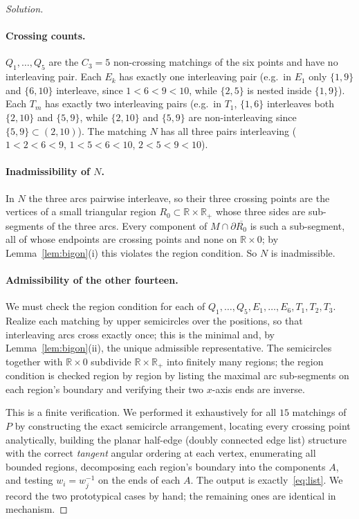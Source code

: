 \documentclass{amsart}
\theoremstyle{definition}
\newcommand{\RR}{\mathbb{R}}
\newcommand{\bdy}{\partial}
\begin{document}
\begin{proof}[Solution]
\paragraph{Crossing counts.}
$Q_1,\dots,Q_5$ are the $C_3=5$ non-crossing matchings of the six points and have no
interleaving pair. Each $E_k$ has exactly one interleaving pair (e.g.\ in $E_1$ only
$\{1,9\}$ and $\{6,10\}$ interleave, since $1<6<9<10$, while $\{2,5\}$ is nested inside
$\{1,9\}$). Each $T_m$ has exactly two interleaving pairs (e.g.\ in $T_1$, $\{1,6\}$ interleaves
both $\{2,10\}$ and $\{5,9\}$, while $\{2,10\}$ and $\{5,9\}$ are non-interleaving since
$\{5,9\}\subset(2,10)$). The matching $N$ has all three pairs interleaving
($1<2<6<9$, $1<5<6<10$, $2<5<9<10$).

\paragraph{Inadmissibility of $N$.}
In $N$ the three arcs pairwise interleave, so their three crossing points are the vertices of
a small triangular region $R_0\subset\RR\times\RR_+$ whose three sides are sub-segments of the
three arcs. Every component of $M\cap\bdy\overline{R_0}$ is such a sub-segment, all of whose
endpoints are crossing points and none on $\RR\times0$; by Lemma~\ref{lem:bigon}(i) this
violates the region condition. So $N$ is inadmissible.

\paragraph{Admissibility of the other fourteen.}
We must check the region condition for each of $Q_1,\dots,Q_5,E_1,\dots,E_6,T_1,T_2,T_3$.
Realize each matching by upper semicircles over the positions, so that interleaving arcs cross
exactly once; this is the minimal and, by Lemma~\ref{lem:bigon}(ii), the unique admissible
representative. The semicircles together with $\RR\times0$ subdivide $\RR\times\RR_+$ into
finitely many regions; the region condition is checked region by region by listing the maximal
arc sub-segments on each region's boundary and verifying their two $x$-axis ends are inverse.

This is a finite verification. We performed it exhaustively for all $15$ matchings of $P$ by
constructing the exact semicircle arrangement, locating every crossing point analytically,
building the planar half-edge (doubly connected edge list) structure with the correct
\emph{tangent} angular ordering at each vertex, enumerating all bounded regions, decomposing
each region's boundary into the components $A$, and testing $w_i=w_j^{-1}$ on the ends of each
$A$. The output is exactly~\eqref{eq:list}. We record the two prototypical cases by hand; the
remaining ones are identical in mechanism.


\end{proof}
\end{document}
